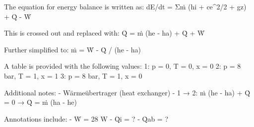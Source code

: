 The equation for energy balance is written as:  
dE/dt = Σṁ (hi + ce^2/2 + gz) + Q̇ - Ẇ  

This is crossed out and replaced with:  
Q̇ = ṁ (he - ha) + Q̇ + Ẇ  

Further simplified to:  
ṁ = Ẇ - Q̇ / (he - ha)  

A table is provided with the following values:  
1: p = 0, T = 0, x = 0  
2: p = 8 bar, T = 1, x = 1  
3: p = 8 bar, T = 1, x = 0  

Additional notes:  
- Wärmeübertrager (heat exchanger)  
- 1 → 2: ṁ (he - ha) + Q̇ = 0 → Q̇ = ṁ (ha - he)  

Annotations include:  
- Ẇ = 28 W  
- Q̇i = ?  
- Q̇ab = ?